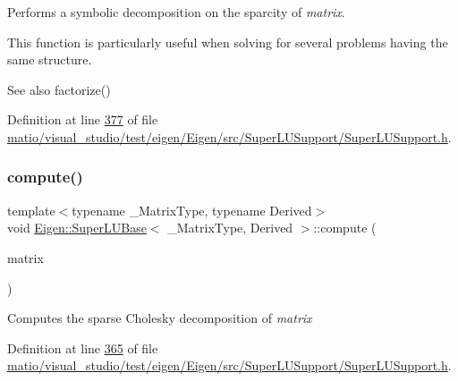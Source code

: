 Performs a symbolic decomposition on the sparcity of {\itshape matrix}.

This function is particularly useful when solving for several problems having the same structure.

\begin{DoxySeeAlso}{See also}
factorize() 
\end{DoxySeeAlso}


Definition at line \hyperlink{matio_2visual__studio_2test_2eigen_2_eigen_2src_2_super_l_u_support_2_super_l_u_support_8h_source_l00377}{377} of file \hyperlink{matio_2visual__studio_2test_2eigen_2_eigen_2src_2_super_l_u_support_2_super_l_u_support_8h_source}{matio/visual\+\_\+studio/test/eigen/\+Eigen/src/\+Super\+L\+U\+Support/\+Super\+L\+U\+Support.\+h}.

\mbox{\label{class_eigen_1_1_super_l_u_base_a28cb3ef7914ecb6fdae1935b53f6be40}} 
\subsubsection{\texorpdfstring{compute()}{compute()}\hspace{0.1cm}{\footnotesize\ttfamily [1/2]}}
{\footnotesize\ttfamily template$<$typename \+\_\+\+Matrix\+Type, typename Derived$>$ \\
void \hyperlink{class_eigen_1_1_super_l_u_base}{Eigen\+::\+Super\+L\+U\+Base}$<$ \+\_\+\+Matrix\+Type, Derived $>$\+::compute (\begin{DoxyParamCaption}\item[{const Matrix\+Type \&}]{matrix }\end{DoxyParamCaption})\hspace{0.3cm}{\ttfamily [inline]}}

Computes the sparse Cholesky decomposition of {\itshape matrix} 

Definition at line \hyperlink{matio_2visual__studio_2test_2eigen_2_eigen_2src_2_super_l_u_support_2_super_l_u_support_8h_source_l00365}{365} of file \hyperlink{matio_2visual__studio_2test_2eigen_2_eigen_2src_2_super_l_u_support_2_super_l_u_support_8h_source}{matio/visual\+\_\+studio/test/eigen/\+Eigen/src/\+Super\+L\+U\+Support/\+Super\+L\+U\+Support.\+h}.

\mbox{\label{class_eigen_1_1_super_l_u_base_a28cb3ef7914ecb6fdae1935b53f6be40}} 
